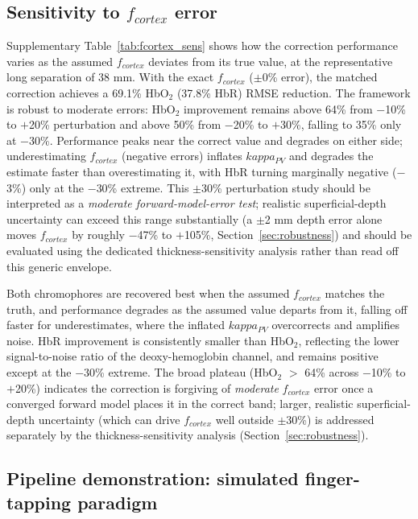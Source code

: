 \documentclass[11pt]{article}
\def\kappa{kappa}%
\def\mathrm#1{#1}%
\def\,{ }%
\begin{document}
\subsection{Sensitivity to \texorpdfstring{$f_{\mathrm{cortex}}$}{f\_cortex} error}
\label{sec:fcortex_sensitivity}

Supplementary Table~\ref{tab:fcortex_sens} shows how the correction performance varies as the assumed $f_{\mathrm{cortex}}$ deviates from its true value, at the representative long separation of 38\,mm. With the exact $f_{\mathrm{cortex}}$ ($\pm$0\% error), the matched correction achieves a 69.1\% HbO$_2$ (37.8\% HbR) RMSE reduction. The framework is robust to moderate errors: HbO$_2$ improvement remains above 64\% from $-$10\% to $+$20\% perturbation and above 50\% from $-$20\% to $+$30\%, falling to 35\% only at $-$30\%. Performance peaks near the correct value and degrades on either side; underestimating $f_{\mathrm{cortex}}$ (negative errors) inflates $\kappa_{\mathrm{PV}}$ and degrades the estimate faster than overestimating it, with HbR turning marginally negative ($-$3\%) only at the $-$30\% extreme. This $\pm$30\% perturbation study should be interpreted as a \emph{moderate forward-model-error test}; realistic superficial-depth uncertainty can exceed this range substantially (a $\pm$2\,mm depth error alone moves $f_{\mathrm{cortex}}$ by roughly $-$47\% to $+$105\%, Section~\ref{sec:robustness}) and should be evaluated using the dedicated thickness-sensitivity analysis rather than read off this generic envelope.



Both chromophores are recovered best when the assumed $f_{\mathrm{cortex}}$ matches the truth, and performance degrades as the assumed value departs from it, falling off faster for underestimates, where the inflated $\kappa_{\mathrm{PV}}$ overcorrects and amplifies noise. HbR improvement is consistently smaller than HbO$_2$, reflecting the lower signal-to-noise ratio of the deoxy-hemoglobin channel, and remains positive except at the $-$30\% extreme. The broad plateau (HbO$_2$ $>$\,64\% across $-$10\% to $+$20\%) indicates the correction is forgiving of \emph{moderate} $f_{\mathrm{cortex}}$ error once a converged forward model places it in the correct band; larger, realistic superficial-depth uncertainty (which can drive $f_{\mathrm{cortex}}$ well outside $\pm$30\%) is addressed separately by the thickness-sensitivity analysis (Section~\ref{sec:robustness}).

\subsection{Pipeline demonstration: simulated finger-tapping paradigm}
\label{sec:pipeline_demo}
\end{document}
